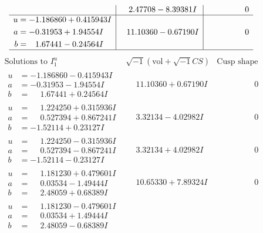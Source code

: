 \documentclass[1p]{elsarticle_modified}
\theoremstyle{definition}
\newcommand{\I}{\sqrt{-1}}
\begin{document}
$$\begin{array}{c|c|c}
 & \phantom{-}2.47708 - 8.39381 I & \phantom{-0.000000 } 0 \\ \hline\begin{aligned}
u &= -1.186860 + 0.415943 I \\
a &= -0.31953 + 1.94554 I \\
b &= \phantom{-}1.67441 - 0.24564 I\end{aligned}
 & \phantom{-}11.10360 - 0.67190 I & \phantom{-0.000000 } 0\\
 \hline 
 \end{array}$$\newpage$$\begin{array}{c|c|c}  
\text{Solutions to }I^u_{1}& \I (\text{vol} + \sqrt{-1}CS) & \text{Cusp shape}\\
 \hline 
\begin{aligned}
u &= -1.186860 - 0.415943 I \\
a &= -0.31953 - 1.94554 I \\
b &= \phantom{-}1.67441 + 0.24564 I\end{aligned}
 & \phantom{-}11.10360 + 0.67190 I & \phantom{-0.000000 } 0 \\ \hline\begin{aligned}
u &= \phantom{-}1.224250 + 0.315936 I \\
a &= \phantom{-}0.527394 + 0.867241 I \\
b &= -1.52114 + 0.23127 I\end{aligned}
 & \phantom{-}3.32134 - 4.02982 I & \phantom{-0.000000 } 0 \\ \hline\begin{aligned}
u &= \phantom{-}1.224250 - 0.315936 I \\
a &= \phantom{-}0.527394 - 0.867241 I \\
b &= -1.52114 - 0.23127 I\end{aligned}
 & \phantom{-}3.32134 + 4.02982 I & \phantom{-0.000000 } 0 \\ \hline\begin{aligned}
u &= \phantom{-}1.181230 + 0.479601 I \\
a &= \phantom{-}0.03534 - 1.49444 I \\
b &= \phantom{-}2.48059 + 0.68389 I\end{aligned}
 & \phantom{-}10.65330 + 7.89324 I & \phantom{-0.000000 } 0 \\ \hline\begin{aligned}
u &= \phantom{-}1.181230 - 0.479601 I \\
a &= \phantom{-}0.03534 + 1.49444 I \\
b &= \phantom{-}2.48059 - 0.68389 I\end{aligned}

\end{array}$$
\end{document}
